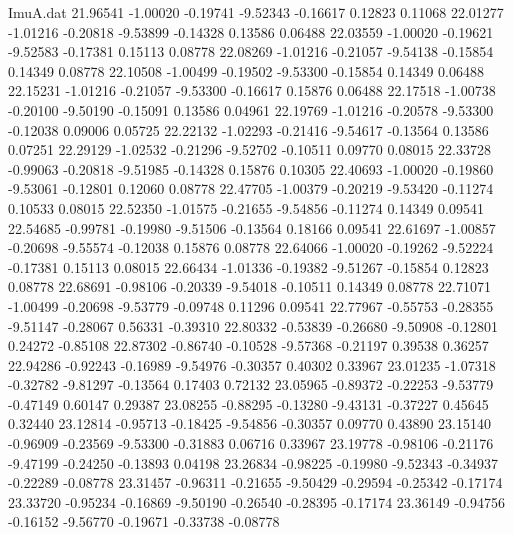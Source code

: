 \begin{filecontents}{ImuA.dat}
  21.96541   -1.00020   -0.19741   -9.52343   -0.16617    0.12823    0.11068
  22.01277   -1.01216   -0.20818   -9.53899   -0.14328    0.13586    0.06488
  22.03559   -1.00020   -0.19621   -9.52583   -0.17381    0.15113    0.08778
  22.08269   -1.01216   -0.21057   -9.54138   -0.15854    0.14349    0.08778
  22.10508   -1.00499   -0.19502   -9.53300   -0.15854    0.14349    0.06488
  22.15231   -1.01216   -0.21057   -9.53300   -0.16617    0.15876    0.06488
  22.17518   -1.00738   -0.20100   -9.50190   -0.15091    0.13586    0.04961
  22.19769   -1.01216   -0.20578   -9.53300   -0.12038    0.09006    0.05725
  22.22132   -1.02293   -0.21416   -9.54617   -0.13564    0.13586    0.07251
  22.29129   -1.02532   -0.21296   -9.52702   -0.10511    0.09770    0.08015
  22.33728   -0.99063   -0.20818   -9.51985   -0.14328    0.15876    0.10305
  22.40693   -1.00020   -0.19860   -9.53061   -0.12801    0.12060    0.08778
  22.47705   -1.00379   -0.20219   -9.53420   -0.11274    0.10533    0.08015
  22.52350   -1.01575   -0.21655   -9.54856   -0.11274    0.14349    0.09541
  22.54685   -0.99781   -0.19980   -9.51506   -0.13564    0.18166    0.09541
  22.61697   -1.00857   -0.20698   -9.55574   -0.12038    0.15876    0.08778
  22.64066   -1.00020   -0.19262   -9.52224   -0.17381    0.15113    0.08015
  22.66434   -1.01336   -0.19382   -9.51267   -0.15854    0.12823    0.08778
  22.68691   -0.98106   -0.20339   -9.54018   -0.10511    0.14349    0.08778
  22.71071   -1.00499   -0.20698   -9.53779   -0.09748    0.11296    0.09541
  22.77967   -0.55753   -0.28355   -9.51147   -0.28067    0.56331   -0.39310
  22.80332   -0.53839   -0.26680   -9.50908   -0.12801    0.24272   -0.85108
  22.87302   -0.86740   -0.10528   -9.57368   -0.21197    0.39538    0.36257
  22.94286   -0.92243   -0.16989   -9.54976   -0.30357    0.40302    0.33967
  23.01235   -1.07318   -0.32782   -9.81297   -0.13564    0.17403    0.72132
  23.05965   -0.89372   -0.22253   -9.53779   -0.47149    0.60147    0.29387
  23.08255   -0.88295   -0.13280   -9.43131   -0.37227    0.45645    0.32440
  23.12814   -0.95713   -0.18425   -9.54856   -0.30357    0.09770    0.43890
  23.15140   -0.96909   -0.23569   -9.53300   -0.31883    0.06716    0.33967
  23.19778   -0.98106   -0.21176   -9.47199   -0.24250   -0.13893    0.04198
  23.26834   -0.98225   -0.19980   -9.52343   -0.34937   -0.22289   -0.08778
  23.31457   -0.96311   -0.21655   -9.50429   -0.29594   -0.25342   -0.17174
  23.33720   -0.95234   -0.16869   -9.50190   -0.26540   -0.28395   -0.17174
  23.36149   -0.94756   -0.16152   -9.56770   -0.19671   -0.33738   -0.08778

\end{filecontents}
